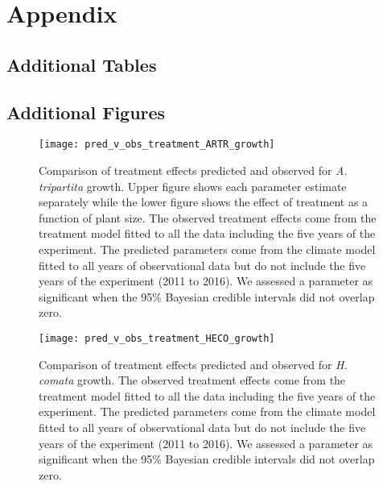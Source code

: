 \documentclass[11pt]{article}
\begin{document}

\vspace{0.4in} 

\section{Appendix}
\subsection*{Additional Tables} \label{appendix}




\clearpage
\newpage

\subsection*{Additional Figures} 

\begin{figure}[!htbp]
	\centering
	\texttt{[image: pred\_v\_obs\_treatment\_ARTR\_growth]}
	\caption{Comparison of treatment effects predicted and observed for \textit{A. tripartita} growth.  Upper figure shows each parameter estimate separately while the lower figure shows the effect of treatment as a function of plant size.  The observed treatment effects come from the treatment model fitted to all the data including the five years of the experiment.  The predicted parameters come from the climate model fitted to all years of observational data but do not include the five years of the experiment (2011 to 2016). We assessed a parameter as significant when the 95\% Bayesian credible intervals did not overlap zero.}
	\label{fig:parPredARTRGrowth}
\end{figure}

\begin{figure}[!htbp]
	\centering
	\texttt{[image: pred\_v\_obs\_treatment\_HECO\_growth]}
	\caption{Comparison of treatment effects predicted and observed for \textit{H. comata} growth.  The observed treatment effects come from the treatment model fitted to all the data including the five years of the experiment.  The predicted parameters come from the climate model fitted to all years of observational data but do not include the five years of the experiment (2011 to 2016). We assessed a parameter as significant when the 95\% Bayesian credible intervals did not overlap zero.}
	\label{fig:parPredHECOGrowth}
\end{figure}
\end{document}
